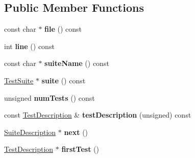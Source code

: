 \subsection*{Public Member Functions}
\begin{DoxyCompactItemize}
\item 
\hypertarget{classCxxTest_1_1DummySuiteDescription_a7b28edf5e71e16115eecb5dfe47634d3}{const char $\ast$ {\bfseries file} () const }\label{classCxxTest_1_1DummySuiteDescription_a7b28edf5e71e16115eecb5dfe47634d3}

\item 
\hypertarget{classCxxTest_1_1DummySuiteDescription_a52a1153215623e8ab8a74a6065e18c24}{int {\bfseries line} () const }\label{classCxxTest_1_1DummySuiteDescription_a52a1153215623e8ab8a74a6065e18c24}

\item 
\hypertarget{classCxxTest_1_1DummySuiteDescription_a127442ba0751eac44d7a58d111b6b85e}{const char $\ast$ {\bfseries suite\-Name} () const }\label{classCxxTest_1_1DummySuiteDescription_a127442ba0751eac44d7a58d111b6b85e}

\item 
\hypertarget{classCxxTest_1_1DummySuiteDescription_a468a690741c697e004293a7743835e92}{\hyperlink{classCxxTest_1_1TestSuite}{Test\-Suite} $\ast$ {\bfseries suite} () const }\label{classCxxTest_1_1DummySuiteDescription_a468a690741c697e004293a7743835e92}

\item 
\hypertarget{classCxxTest_1_1DummySuiteDescription_a842b33fdb7947ccec0b970900a6e29a0}{unsigned {\bfseries num\-Tests} () const }\label{classCxxTest_1_1DummySuiteDescription_a842b33fdb7947ccec0b970900a6e29a0}

\item 
\hypertarget{classCxxTest_1_1DummySuiteDescription_a316d81f0134d18b50be4d4d84d798895}{const \hyperlink{classCxxTest_1_1TestDescription}{Test\-Description} \& {\bfseries test\-Description} (unsigned) const }\label{classCxxTest_1_1DummySuiteDescription_a316d81f0134d18b50be4d4d84d798895}

\item 
\hypertarget{classCxxTest_1_1DummySuiteDescription_a4215f951042621608a176b65384dd540}{\hyperlink{classCxxTest_1_1SuiteDescription}{Suite\-Description} $\ast$ {\bfseries next} ()}\label{classCxxTest_1_1DummySuiteDescription_a4215f951042621608a176b65384dd540}

\item 
\hypertarget{classCxxTest_1_1DummySuiteDescription_a0915da66e14e88a117b559cd30d5e3cb}{\hyperlink{classCxxTest_1_1TestDescription}{Test\-Description} $\ast$ {\bfseries first\-Test} ()}\label{classCxxTest_1_1DummySuiteDescription_a0915da66e14e88a117b559cd30d5e3cb}


\end{DoxyCompactItemize}
